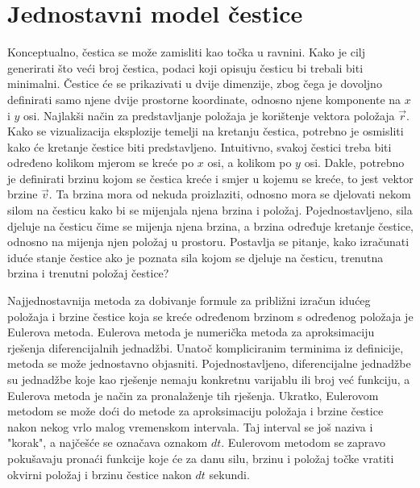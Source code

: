 \documentclass{foi}
\begin{document}
\section{Jednostavni model čestice}
 Konceptualno, čestica se može zamisliti kao točka u ravnini. Kako je cilj generirati što veći broj čestica, podaci koji opisuju česticu bi trebali biti minimalni. Čestice će se prikazivati u dvije dimenzije, zbog čega je dovoljno definirati samo njene dvije prostorne koordinate, odnosno njene komponente na $x$ i $y$ osi. Najlakši način za predstavljanje položaja je korištenje vektora položaja $\vec{r}$. Kako se vizualizacija eksplozije temelji na kretanju čestica, potrebno je osmisliti kako će kretanje čestice biti predstavljeno. Intuitivno, svakoj čestici treba biti određeno kolikom mjerom se kreće po $x$ osi, a kolikom po $y$ osi. Dakle, potrebno je definirati brzinu kojom se čestica kreće i smjer u kojemu se kreće, to jest vektor brzine $\vec{v}$. Ta brzina mora od nekuda proizlaziti, odnosno mora se djelovati nekom silom na česticu kako bi se mijenjala njena brzina i položaj. Pojednostavljeno, sila djeluje na česticu čime se mijenja njena brzina, a brzina određuje kretanje čestice, odnosno na mijenja njen položaj u prostoru. Postavlja se pitanje, kako izračunati iduće stanje čestice ako je poznata sila kojom se djeluje na česticu, trenutna brzina i trenutni položaj čestice?

 Najjednostavnija metoda za dobivanje formule za približni izračun idućeg položaja  i brzine čestice koja se kreće određenom brzinom s određenog položaja je Eulerova metoda. Eulerova metoda je numerička metoda za aproksimaciju rješenja diferencijalnih jednadžbi. Unatoč kompliciranim terminima iz definicije, metoda se može jednostavno objasniti. Pojednostavljeno, diferencijalne jednadžbe su jednadžbe koje kao rješenje nemaju konkretnu varijablu ili broj već funkciju, a Eulerova metoda je način za pronalaženje tih rješenja. Ukratko, Eulerovom metodom se može doći do metode za aproksimaciju položaja i brzine čestice nakon nekog vrlo malog vremenskom intervala. Taj interval se još naziva i "korak", a najčešće se označava oznakom $dt$. Eulerovom metodom se zapravo pokušavaju pronaći funkcije koje će za danu silu, brzinu i položaj točke vratiti okvirni položaj i brzinu čestice nakon $dt$ sekundi.
\end{document}
